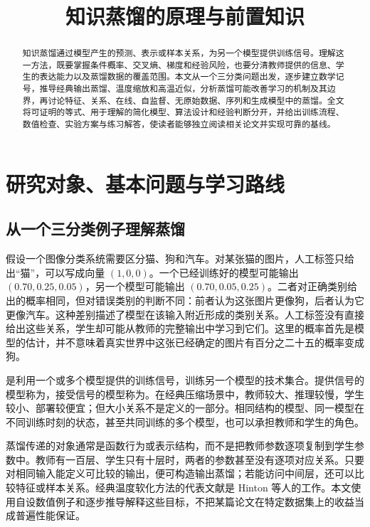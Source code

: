 \documentclass[UTF8,12pt,a4paper,fontset=fandol]{ctexart}
\title{知识蒸馏的原理与前置知识}
\author{}
\date{}
\begin{document}
\maketitle

\begin{abstract}
知识蒸馏通过模型产生的预测、表示或样本关系，为另一个模型提供训练信号。理解这一方法，既要掌握条件概率、交叉熵、梯度和经验风险，也要分清教师提供的信息、学生的表达能力以及蒸馏数据的覆盖范围。本文从一个三分类问题出发，逐步建立数学记号，推导经典输出蒸馏、温度缩放和高温近似，分析蒸馏可能改善学习的机制及其边界，再讨论特征、关系、在线、自监督、无原始数据、序列和生成模型中的蒸馏。全文将可证明的等式、用于理解的简化模型、算法设计和经验判断分开，并给出训练流程、数值检查、实验方案与练习解答，使读者能够独立阅读相关论文并实现可靠的基线。
\end{abstract}
\tableofcontents

\section{研究对象、基本问题与学习路线}
\label{sec:kd-introduction}

\subsection{从一个三分类例子理解蒸馏}
假设一个图像分类系统需要区分猫、狗和汽车。对某张猫的图片，人工标签只给出“猫”，可以写成向量 $(1,0,0)$。一个已经训练好的模型可能输出 $(0.70,0.25,0.05)$，另一个模型可能输出 $(0.70,0.05,0.25)$。二者对正确类别给出的概率相同，但对错误类别的判断不同：前者认为这张图片更像狗，后者认为它更像汽车。这种差别描述了模型在该输入附近形成的类别关系。人工标签没有直接给出这些关系，学生却可能从教师的完整输出中学习到它们。这里的概率首先是模型的估计，并不意味着真实世界中这张已经确定的图片有百分之二十五的概率变成狗。

是利用一个或多个模型提供的训练信号，训练另一个模型的技术集合。提供信号的模型称为，接受信号的模型称为。在经典压缩场景中，教师较大、推理较慢，学生较小、部署较便宜；但大小关系不是定义的一部分。相同结构的模型、同一模型在不同训练时刻的状态，甚至共同训练的多个模型，也可以承担教师和学生的角色。

蒸馏传递的对象通常是函数行为或表示结构，而不是把教师参数逐项复制到学生参数中。教师有一百层、学生只有十层时，两者的参数甚至没有逐项对应关系。只要对相同输入能定义可比较的输出，便可构造输出蒸馏；若能访问中间层，还可以比较特征或样本关系。经典温度软化方法的代表文献是 Hinton 等人的工作\cite{hinton2015}。本文使用自设数值例子和逐步推导解释这些目标，不把某篇论文在特定数据集上的收益当成普遍性能保证。
\end{document}
